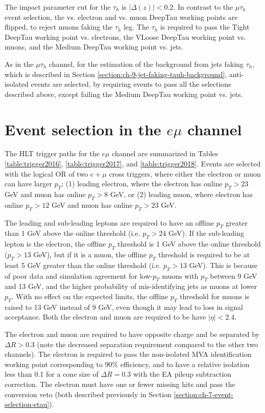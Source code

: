 The impact parameter cut for the $\tau_h$ is  $|\Delta(z)| < 0.2$. In contrast to the $\mu\tau_{h}$ event selection, the vs. electron and vs. muon DeepTau working points are flipped, to reject muons faking the $\tau_{h}$ leg. The $\tau_h$ is required to pass the Tight DeepTau working point vs. electrons, the VLoose DeepTau working point vs. muons, and the Medium DeepTau working point vs. jets.

As in the $\mu\tau_{h}$ channel, for the estimation of the background from jets faking $\tau_{h}$, which is described in Section \ref{section:ch-9-jet-faking-tauh-background}, anti-isolated events are selected, by requiring events to pass all the selections described above, except failing the Medium DeepTau working point vs. jets.

\section{Event selection in the $e\mu$ channel}
\label{section:ch-7-event-selection-emu}

The HLT trigger paths for the $e\mu$ channel are summarized in Tables \ref{table:trigger2016}, \ref{table:trigger2017}, and \ref{table:trigger2018}. Events are selected with the logical OR of two $e+\mu$ cross triggers, where either the electron or muon can have larger $p_{T}$: (1) leading electron, where the electron has online $p_{T} > 23$ GeV and muon has online $p_{T} > 8$ GeV, or (2) leading muon, where electron has online $p_{T} > 12$ GeV and muon has online $p_{T}>23$ GeV.

The leading and sub-leading leptons are required to have an offline $p_{T}$ greater than 1 GeV above the online threshold (i.e. $p_{T} > 24$ GeV). If the sub-leading lepton is the electron, the offline $p_{T}$ threshold is 1 GeV above the online threshold ($p_{T} > 13$ GeV), but if it is a muon, the offline $p_{T}$ threshold is required to be at least 5 GeV greater than the online threshold (i.e. $p_T > 13$ GeV). This is because of poor data and simulation agreement for low-$p_T$ muons with $p_T$ between 9 GeV and 13 GeV, and the higher probability of mis-identifying jets as muons at lower $p_{T}$. With no effect on the expected limits, the offline $p_{T}$ threshold for muons is raised to 13 GeV instead of 9 GeV, even though it may lead to loss in signal acceptance. Both the electron and muon are required to be have $|\eta| < 2.4$.

The electron and muon are required to have opposite charge and be separated by $\Delta R > 0.3$ (note the decreased separation requirement compared to the other two channels). The electron is required to pass the non-isolated MVA identification working point corresponding to 90\% efficiency, and to have a relative isolation less than 0.1 for a cone size of $\Delta R = 0.3$ with the EA pileup subtraction correction. The electron must have one or fewer missing hits and pass the conversion veto (both described previously in Section \ref{section:ch-7-event-selection-etau}). 

